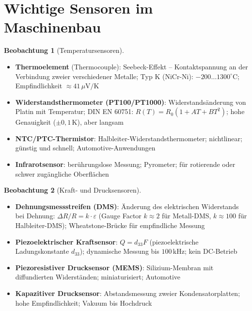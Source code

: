 ﻿\documentclass[a4paper,12pt]{report}
\theoremstyle{definition}
\newtheorem{beobachtung}{Beobachtung}
\begin{document}
\section{Wichtige Sensoren im Maschinenbau}

\begin{beobachtung}[Temperatursensoren]
\begin{itemize}
    \item[-] \textbf{Thermoelement} (Thermocouple): Seebeck-Effekt -- Kontaktspannung
          an der Verbindung zweier verschiedener Metalle; Typ K (NiCr-Ni):
          $-200\ldots1300^\circ\mathrm{C}$; Empfindlichkeit $\approx 41\,\mu\mathrm{V/K}$
    \item[-] \textbf{Widerstandsthermometer (PT100/PT1000)}: Widerstandsänderung
          von Platin mit Temperatur; DIN EN 60751: $R(T) = R_0(1 + A T + B T^2)$;
          hohe Genauigkeit ($\pm 0{,}1\,\mathrm{K}$), aber langsam
    \item[-] \textbf{NTC/PTC-Thermistor}: Halbleiter-Widerstandsthermometer;
          nichtlinear; günstig und schnell; Automotive-Anwendungen
    \item[-] \textbf{Infrarotsensor}: berührungslose Messung; Pyrometer;
          für rotierende oder schwer zugängliche Oberflächen
\end{itemize}
\end{beobachtung}

\begin{beobachtung}[Kraft- und Drucksensoren]
\begin{itemize}
    \item[-] \textbf{Dehnungsmessstreifen (DMS)}: Änderung des elektrischen
          Widerstands bei Dehnung: $\Delta R / R = k \cdot \varepsilon$
          (Gauge Factor $k \approx 2$ für Metall-DMS, $k \approx 100$ für Halbleiter-DMS);
          Wheatstone-Brücke für empfindliche Messung
    \item[-] \textbf{Piezoelektrischer Kraftsensor}: $Q = d_{33} F$
          (piezoelektrische Ladungskonstante $d_{33}$);
          dynamische Messung bis $100\,\mathrm{kHz}$; kein DC-Betrieb
    \item[-] \textbf{Piezoresistiver Drucksensor (MEMS)}: Silizium-Membran
          mit diffundierten Widerständen; miniaturisiert; Automotive
    \item[-] \textbf{Kapazitiver Drucksensor}: Abstandsmessung zweier
          Kondensatorplatten; hohe Empfindlichkeit; Vakuum bis Hochdruck
\end{itemize}
\end{beobachtung}
\end{document}
